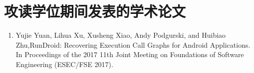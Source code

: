 \chapter*{攻读学位期间发表的学术论文}



\begin{enumerate}
	
	\item Yujie Yuan, Lihua Xu, Xusheng Xiao, Andy Podgurski, and Huibiao Zhu,RunDroid: Recovering Execution Call Graphs for Android Applications. In Proceedings of the 2017 11th Joint Meeting on Foundations of Software Engineering (ESEC/FSE 2017).
	
\end{enumerate}


